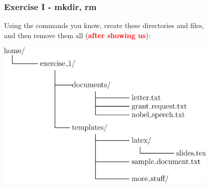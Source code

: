 \documentclass[unknownkeysallowed, 10pt, a4 paper, handout]{beamer}
\newcommand{\focus}[1]{\textbf{\textcolor{red}{#1}}}
\begin{document}
\begin{frame}[c]
  \begin{center}
    \frametitle{Exercise I - mkdir, rm}
    Using the commands you know, create these directories and files,\\
    and then remove them all (\focus{after showing us}):

    \begin{center}
      \includegraphics[width=0.80\textwidth]{pics/exercise_1.eps}
    \end{center}
  \end{center}
\end{frame}
\end{document}
